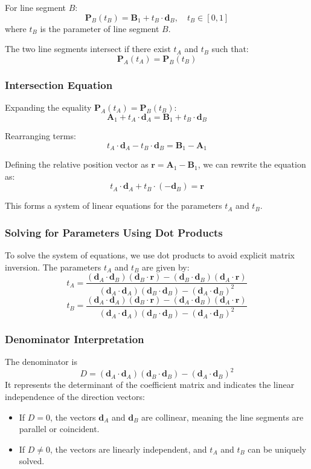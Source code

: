 \documentclass[a4paper]{article}
\begin{document}
\begin{sloppypar}
For line segment \(B\):
\[
\mathbf{P}_B(t_B) = \mathbf{B}_1 + t_B \cdot \mathbf{d}_B, \quad t_B \in [0, 1]
\]
where \(t_B\) is the parameter of line segment \(B\).

The two line segments intersect if there exist \(t_A\) and \(t_B\) such that:
\[
\mathbf{P}_A(t_A) = \mathbf{P}_B(t_B)
\]

\subsubsection{Intersection Equation}

Expanding the equality \(\mathbf{P}_A(t_A) = \mathbf{P}_B(t_B)\):
\[
\mathbf{A}_1 + t_A \cdot \mathbf{d}_A = \mathbf{B}_1 + t_B \cdot \mathbf{d}_B
\]

Rearranging terms:
\[
t_A \cdot \mathbf{d}_A - t_B \cdot \mathbf{d}_B = \mathbf{B}_1 - \mathbf{A}_1
\]

Defining the relative position vector as \(\mathbf{r} = \mathbf{A}_1 - \mathbf{B}_1\), we can rewrite the equation as:
\[
t_A \cdot \mathbf{d}_A + t_B \cdot (-\mathbf{d}_B) = \mathbf{r}
\]

This forms a system of linear equations for the parameters \(t_A\) and \(t_B\).

\subsubsection{Solving for Parameters Using Dot Products}

To solve the system of equations, we use dot products to avoid explicit matrix inversion. The parameters \(t_A\) and \(t_B\) are given by:
\[
t_A = \frac{(\mathbf{d}_A \cdot \mathbf{d}_B)(\mathbf{d}_B \cdot \mathbf{r}) - (\mathbf{d}_B \cdot \mathbf{d}_B)(\mathbf{d}_A \cdot \mathbf{r})}{(\mathbf{d}_A \cdot \mathbf{d}_A)(\mathbf{d}_B \cdot \mathbf{d}_B) - (\mathbf{d}_A \cdot \mathbf{d}_B)^2}
\]
\[
t_B = \frac{(\mathbf{d}_A \cdot \mathbf{d}_A)(\mathbf{d}_B \cdot \mathbf{r}) - (\mathbf{d}_A \cdot \mathbf{d}_B)(\mathbf{d}_A \cdot \mathbf{r})}{(\mathbf{d}_A \cdot \mathbf{d}_A)(\mathbf{d}_B \cdot \mathbf{d}_B) - (\mathbf{d}_A \cdot \mathbf{d}_B)^2}
\]

\subsubsection{Denominator Interpretation}

The denominator is
\[
D = (\mathbf{d}_A \cdot \mathbf{d}_A)(\mathbf{d}_B \cdot \mathbf{d}_B) - (\mathbf{d}_A \cdot \mathbf{d}_B)^2
\]
It represents the determinant of the coefficient matrix and indicates the linear independence of the direction vectors:
\begin{itemize}
  \item If \(D = 0\), the vectors \(\mathbf{d}_A\) and \(\mathbf{d}_B\) are collinear, meaning the line segments are parallel or coincident.
  \item If \(D \neq 0\), the vectors are linearly independent, and \(t_A\) and \(t_B\) can be uniquely solved.
\end{itemize}


\end{sloppypar}
\end{document}
